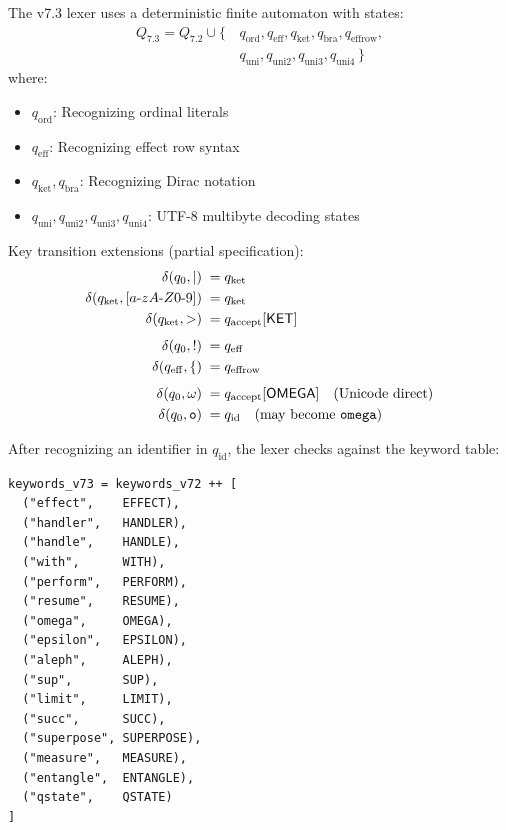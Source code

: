 \begin{definition}
\label{def:lexer-dfa}
The v7.3 lexer uses a deterministic finite automaton with states:
\begin{align}
Q_{7.3} = Q_{7.2} \cup \{&\, q_{\mathrm{ord}}, q_{\mathrm{eff}}, q_{\mathrm{ket}}, q_{\mathrm{bra}}, q_{\mathrm{effrow}}, \\
    &\, q_{\mathrm{uni}}, q_{\mathrm{uni2}}, q_{\mathrm{uni3}}, q_{\mathrm{uni4}} \,\}
\end{align}
where:
\begin{itemize}
  \item $q_{\mathrm{ord}}$: Recognizing ordinal literals
  \item $q_{\mathrm{eff}}$: Recognizing effect row syntax
  \item $q_{\mathrm{ket}}, q_{\mathrm{bra}}$: Recognizing Dirac notation
  \item $q_{\mathrm{uni}}, q_{\mathrm{uni2}}, q_{\mathrm{uni3}}, q_{\mathrm{uni4}}$: UTF-8 multibyte decoding states
\end{itemize}
\end{definition}

\begin{definition}
\label{def:lexer-transitions}
Key transition extensions (partial specification):
\begin{align}
\delta(q_0, \mathtt{|})\; &= q_{\mathrm{ket}} \\
\delta(q_{\mathrm{ket}}, [a\text{-}zA\text{-}Z0\text{-}9])\; &= q_{\mathrm{ket}} \\
\delta(q_{\mathrm{ket}}, \mathtt{>})\; &= q_{\mathrm{accept}}[\mathsf{KET}] \\[1ex]
\delta(q_0, \mathtt{!})\; &= q_{\mathrm{eff}} \\
\delta(q_{\mathrm{eff}}, \mathtt{\{})\; &= q_{\mathrm{effrow}} \\[1ex]
\delta(q_0, \omega)\; &= q_{\mathrm{accept}}[\mathsf{OMEGA}] \quad \text{(Unicode direct)} \\
\delta(q_0, \mathtt{o})\; &= q_{\mathrm{id}} \quad \text{(may become \texttt{omega})}
\end{align}
\end{definition}

\begin{definition}
\label{def:keyword-recognition}
After recognizing an identifier in $q_{\mathrm{id}}$, the lexer checks against the keyword table:
\begin{verbatim}
keywords_v73 = keywords_v72 ++ [
  ("effect",    EFFECT),
  ("handler",   HANDLER),
  ("handle",    HANDLE),
  ("with",      WITH),
  ("perform",   PERFORM),
  ("resume",    RESUME),
  ("omega",     OMEGA),
  ("epsilon",   EPSILON),
  ("aleph",     ALEPH),
  ("sup",       SUP),
  ("limit",     LIMIT),
  ("succ",      SUCC),
  ("superpose", SUPERPOSE),
  ("measure",   MEASURE),
  ("entangle",  ENTANGLE),
  ("qstate",    QSTATE)
]
\end{verbatim}
\end{definition}

